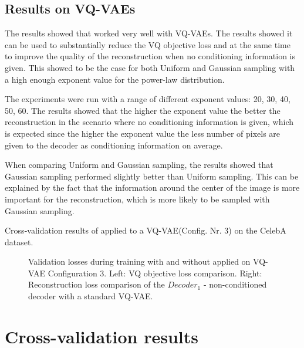 \subsection{Results on VQ-VAEs}

The results showed that  worked very well with VQ-VAEs. The results showed it can be used to substantially reduce the VQ objective loss and at the same time to improve the quality of the reconstruction when no conditioning information is given. This showed to be the case for both Uniform and Gaussian sampling with a high enough exponent value for the power-law distribution.

The experiments were run with a range of different exponent values: 20, 30, 40, 50, 60. The results showed that the higher the exponent value the better the reconstruction in the scenario where no conditioning information is given, which is expected since the higher the exponent value the less number of pixels are given to the decoder as conditioning information on average.

When comparing Uniform and Gaussian sampling, the results showed that Gaussian sampling performed slightly better than Uniform sampling. This can be explained by the fact that the information around the center of the image is more important for the reconstruction, which is more likely to be sampled with Gaussian sampling.


\begin{table}[H]
    \centering
    
    \caption{Cross-validation results of  applied to a VQ-VAE(Config. Nr. 3) on the CelebA dataset.}
    \label{tab:results_method2_vq_vae}
\end{table}
\begin{figure}[H]
    \centering
    \scalebox{0.48}{}
    \scalebox{0.48}{}
    \caption[Validation loss comparison during training of a VQ-VAE.]
    {
        Validation losses during training with and without  applied on VQ-VAE Configuration 3.
        Left: VQ objective loss comparison. Right: Reconstruction loss comparison of the $Decoder_1$ - non-conditioned decoder with a standard VQ-VAE.
    }
    \label{fig:results_method2_vq_vae}
\end{figure}

\section{Cross-validation results} \label{sec:cross_val_results}

